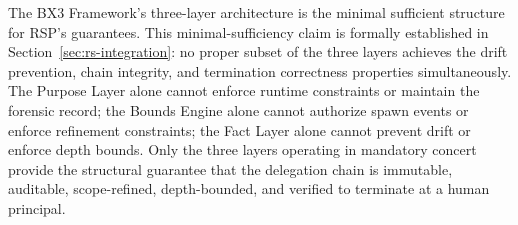 The BX3 Framework's three-layer architecture is the minimal sufficient structure for RSP's guarantees. This minimal-sufficiency claim is formally established in Section~\ref{sec:rs-integration}: no proper subset of the three layers achieves the drift prevention, chain integrity, and termination correctness properties simultaneously. The Purpose Layer alone cannot enforce runtime constraints or maintain the forensic record; the Bounds Engine alone cannot authorize spawn events or enforce refinement constraints; the Fact Layer alone cannot prevent drift or enforce depth bounds. Only the three layers operating in mandatory concert provide the structural guarantee that the delegation chain is immutable, auditable, scope-refined, depth-bounded, and verified to terminate at a human principal.\cite{bx3_recursive_spawning_integration}